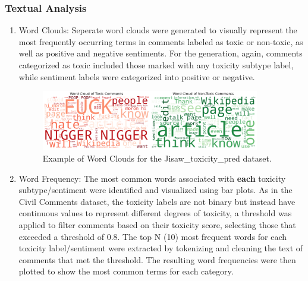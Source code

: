\documentclass[10pt,a4paper,oneside]{article} %
\begin{document}
\subsubsection{Textual Analysis}
\begin{enumerate}
    \item Word Clouds: Seperate word clouds were generated to visually represent the most frequently occurring terms in comments labeled as toxic or non-toxic, as well as positive and negative sentiments. For the generation, again,  comments categorized as toxic included those marked with any toxicity subtype label, while sentiment labels were categorized into positive or negative. 
    \begin{figure}[h]
    \centering
    \includegraphics[width=0.9\textwidth]{replibert/replibert/plots/wordclouds_jigsaw.png}
    \caption{Example of Word Clouds for the Jisaw\_toxicity\_pred dataset.}
    \label{fig:wordcloud_jigsaw}
    \end{figure}
    \item Word Frequency: The most common words associated with \textbf{each} toxicity subtype/sentiment were identified and visualized using bar plots. As in the Civil Comments dataset, the toxicity labels are not binary but instead have continuous values to represent different degrees of toxicity, a threshold was applied to filter comments based on their toxicity score, selecting those that exceeded a threshold of 0.8. The top N (10)  most frequent words for each toxicity label/sentiment were extracted by tokenizing and cleaning the text of comments that met the threshold. The resulting word frequencies were then plotted to show the most common terms for each category. 
    \begin{figure}[h]
    \centering
    \begin{subfigure}{0.49\textwidth}
        \centering

\end{subfigure}
\end{figure}
\end{enumerate}
\end{document}
